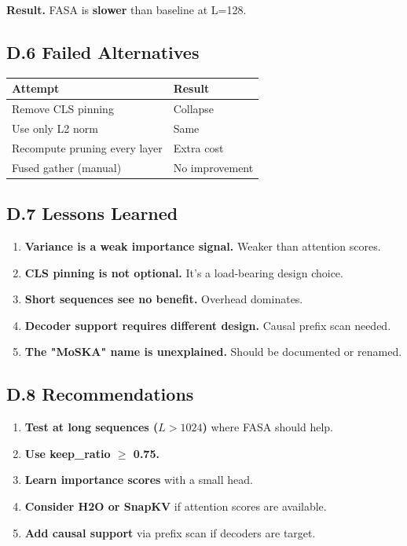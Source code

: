 \textbf{Result.} FASA is \textbf{slower} than baseline at L=128.

\subsection{D.6 Failed Alternatives}

\begin{table}[H]
\centering
\small
\begin{tabular}{ll}
\toprule
\textbf{Attempt} & \textbf{Result} \\
\midrule
Remove CLS pinning & Collapse \\
Use only L2 norm & Same \\
Recompute pruning every layer & Extra cost \\
Fused gather (manual) & No improvement \\
\bottomrule
\end{tabular}
\end{table}

\subsection{D.7 Lessons Learned}

\begin{enumerate}
\item \textbf{Variance is a weak importance signal.} Weaker than attention scores.
\item \textbf{CLS pinning is not optional.} It's a load-bearing design choice.
\item \textbf{Short sequences see no benefit.} Overhead dominates.
\item \textbf{Decoder support requires different design.} Causal prefix scan needed.
\item \textbf{The "MoSKA" name is unexplained.} Should be documented or renamed.

\end{enumerate}
\subsection{D.8 Recommendations}

\begin{enumerate}
\item \textbf{Test at long sequences ($L > 1024$)} where FASA should help.
\item \textbf{Use keep\_ratio $\ge$ 0.75.}
\item \textbf{Learn importance scores} with a small head.
\item \textbf{Consider H2O or SnapKV} if attention scores are available.
\item \textbf{Add causal support} via prefix scan if decoders are target.

\end{enumerate}
